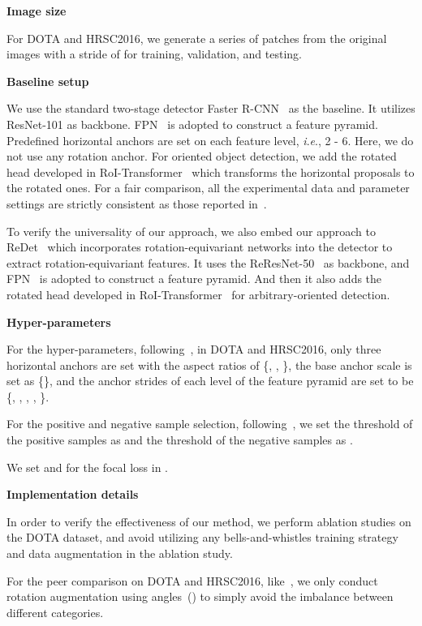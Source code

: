 \documentclass[journal]{IEEEtran}
\newcommand{\myparagraph}[1]{\vspace{0.1em}\noindent\textbf{#1}}
\newcommand{\ie}{\textit{i}.\textit{e}.}
\begin{document}
\myparagraph{Image size} 

For DOTA and HRSC2016, we generate a series of  patches from the original images with a stride of  for training, validation, and testing.

\myparagraph{Baseline setup}

We use the standard two-stage detector Faster R-CNN~\cite{ren2016faster} as the baseline. It utilizes ResNet-101 as backbone. FPN~\cite{lin2017feature} is adopted to construct a feature pyramid. Predefined horizontal anchors are set on each feature level, \ie, 2 - 6. Here, we do not use any rotation anchor. For oriented object detection, we add the rotated head developed in RoI-Transformer~\cite{ding2019learning} which transforms the horizontal proposals to the rotated ones. For a fair comparison, all the experimental data and parameter settings are strictly consistent as those reported in~\cite{ding2019learning, xia2018dota, lb2017high}.


To verify the universality of our approach, we also embed our approach to ReDet~\cite{han2021redet} which incorporates rotation-equivariant networks into the detector to extract rotation-equivariant features. It uses the ReResNet-50~\cite{han2021redet} as backbone, and FPN~\cite{lin2017feature} is adopted to construct a feature pyramid. And then it also adds the rotated head developed in RoI-Transformer~\cite{ding2019learning} for arbitrary-oriented detection.


\myparagraph{Hyper-parameters}

For the hyper-parameters, following~\cite{ding2019learning, ming2020dynamic}, in DOTA and HRSC2016, only three horizontal anchors are set with the aspect ratios of \{, , \}, the base anchor scale is set as \{\}, and the anchor strides of each level of the feature pyramid are set to be \{, , , , \}. 

For the positive and negative sample selection, following~\cite{ren2016faster, ding2019learning}, we set the threshold of the positive samples as  and the threshold of the negative samples as .


We set  and  for the focal loss in . 

\myparagraph{Implementation details}

In order to verify the effectiveness of our method, we perform ablation studies on the DOTA dataset, and avoid utilizing any bells-and-whistles training strategy and data augmentation in the ablation study. 

For the peer comparison on DOTA and HRSC2016, like~\cite{ding2019learning, yang2019scrdet, ming2020dynamic}, we only conduct rotation augmentation using  angles~() to simply avoid the imbalance between different categories.
\end{document}
